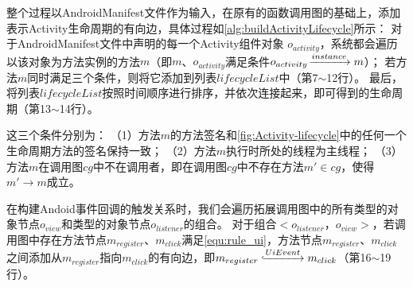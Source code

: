 	
	
整个过程以AndroidManifest文件作为输入，在原有的函数调用图的基础上，添加表示Activity生命周期的有向边，具体过程如\autoref{alg:buildActivityLifecycle}所示：
对于AndroidManifest文件中声明的每一个Activity组件对象 $o_{activity}$，系统都会遍历以该对象为方法实例的方法$m$（即$m$、$o_{activity}$满足条件$o_{activity} \joinrel\xrightarrow{instance} m$）；
若方法$m$同时满足三个条件，则将它添加到列表$lifecycleList$中（第7$\sim$12行）。
最后，将列表$lifecycleList$按照时间顺序进行排序，并依次连接起来，即可得到的生命周期（第13$\sim$14行）。

这三个条件分别为：
（1）方法$m$的方法签名和\autoref{fig:Activity-lifecycle}中的任何一个生命周期方法的签名保持一致；
（2）方法$m$执行时所处的线程为主线程；
（3）方法$m$在调用图$cg$中不在调用者，即在调用图$cg$中不存在方法$m' \in cg$，使得$m' \to m $成立。



在构建Andoid事件回调的触发关系时，我们会遍历拓展调用图中的所有类型的对象节点$o_{view}$和类型的对象节点$o_{listener}$的组合。
对于组合$<o_{listener}$，$o_{view}>$，若调用图中存在方法节点$m_{register} $、$m_{click} $满足\autoref{equ:rule_ui}，方法节点$m_{register} $、$m_{click} $之间添加从$m_{register} $指向$m_{click} $的有向边，即$m_{register} \lhook\joinrel\xrightarrow{UiEvent}  m_{click}  $（第16$\sim$19行）。






